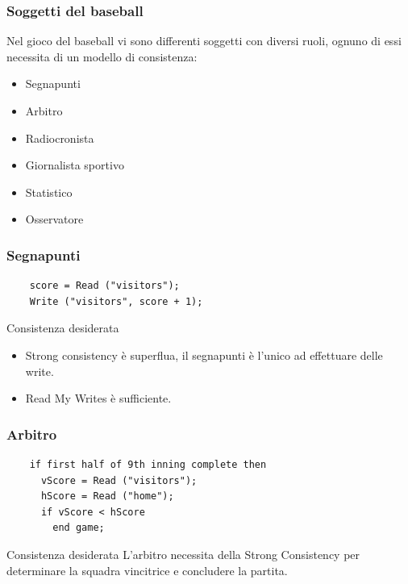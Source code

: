 \begin{frame}
 \frametitle{Soggetti del baseball}
 Nel gioco del baseball vi sono differenti soggetti con diversi ruoli, ognuno di essi necessita di un modello di consistenza:\\
 \begin{itemize}
   \item Segnapunti
   \item Arbitro
   \item Radiocronista
   \item Giornalista sportivo
   \item Statistico
   \item Osservatore
 \end{itemize}
\end{frame}

\begin{frame}[fragile]
 \frametitle{Segnapunti}
  \begin{lstlisting}
    score = Read ("visitors");
    Write ("visitors", score + 1);
  \end{lstlisting}
  \begin{block}{Consistenza desiderata}
    \begin{itemize}
      \item Strong consistency è superflua, il segnapunti è l'unico ad effettuare delle write.
      \item Read My Writes è sufficiente.
    \end{itemize}     
  \end{block}
\end{frame}

\begin{frame}[fragile]
 \frametitle{Arbitro}
  \begin{lstlisting}
    if first half of 9th inning complete then
      vScore = Read ("visitors");
      hScore = Read ("home");
      if vScore < hScore
        end game;
  \end{lstlisting}
 \begin{block}{Consistenza desiderata}
   L'arbitro necessita della Strong Consistency per determinare la squadra vincitrice e concludere la partita.
 \end{block}
\end{frame}

